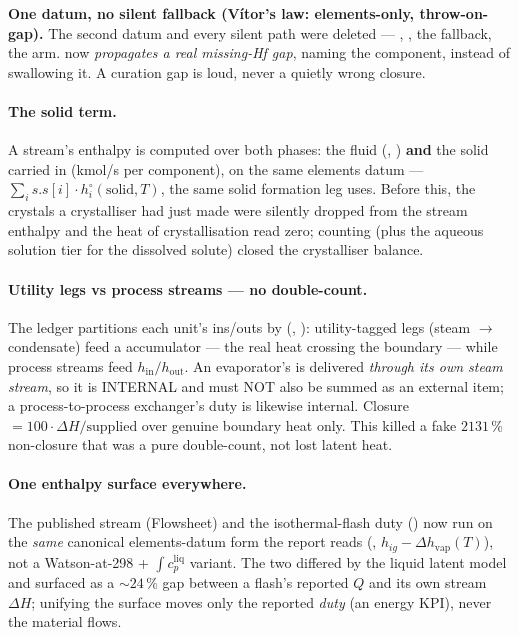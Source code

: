 \documentclass[11pt,a4paper]{article}
\begin{document}
\begin{keyidea}
\textbf{One datum, no silent fallback (Vítor's law: elements-only,
throw-on-gap).}  The second datum and every silent path were deleted ---
, , the  fallback, the  arm.
 now \emph{propagates a real missing-Hf gap}, naming the
component, instead of swallowing it.  A curation gap is loud, never a quietly
wrong closure.
\end{keyidea}

\paragraph{The solid term.}  A stream's enthalpy is computed over both phases:
the fluid (, ) \textbf{and} the solid carried in
 (kmol/s per component), on the same elements datum ---
\(\sum_i s.s[i]\cdot h^\circ_i(\mathrm{solid}, T)\), the same solid formation
leg  uses.  Before this, the crystals a
crystalliser had just made were silently dropped from the stream enthalpy and
the heat of crystallisation read zero; counting  (plus the aqueous
solution tier for the dissolved solute) closed the crystalliser balance.

\paragraph{Utility legs vs process streams --- no double-count.}  The ledger
partitions each unit's ins/outs by 
(, ):
utility-tagged legs (steam $\to$ condensate) feed a 
accumulator --- the real heat crossing the boundary --- while process streams
feed \(h_{\mathrm{in}} / h_{\mathrm{out}}\).  An evaporator's  is
delivered \emph{through its own steam stream}, so it is INTERNAL and must NOT
also be summed as an external item; a process-to-process exchanger's duty is
likewise internal.  Closure \(= 100\cdot\Delta H / \text{supplied}\) over
genuine boundary heat only.  This killed a fake \(2131\,\%\) non-closure that
was a pure double-count, not lost latent heat.

\paragraph{One enthalpy surface everywhere.}  The published stream 
(Flowsheet) and the isothermal-flash duty () now run
on the \emph{same} canonical elements-datum form the report reads
(, \(h_{ig} - \Delta h_{\mathrm{vap}}(T)\)), not a
Watson-at-298 + \(\int c_p^{\mathrm{liq}}\) variant.  The two differed by the
liquid latent model and surfaced as a \(\sim24\,\%\) gap between a flash's
reported \(Q\) and its own stream \(\Delta H\); unifying the surface moves only
the reported \emph{duty} (an energy KPI), never the material flows.
\end{document}
